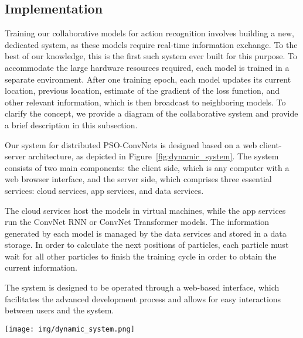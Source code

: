 \documentclass[fleqn,10pt]{wlscirep}
\begin{document}
\subsection{Implementation}
\label{sec:implementation}


Training our collaborative models for action recognition involves building a new, dedicated system, as these models require real-time information exchange. To the best of our knowledge, this is the first such system ever built for this purpose. To accommodate the large hardware resources required, each model is trained in a separate environment. After one training epoch, each model updates its current location, previous location, estimate of the gradient of the loss function, and other relevant information, which is then broadcast to neighboring models. To clarify the concept, we provide a diagram of the collaborative system and provide a brief description in this subsection.





Our system for distributed PSO-ConvNets is designed based on a web client-server architecture, as depicted in Figure~\ref{fig:dynamic_system}. The system consists of two main components: the client side, which is any computer with a web browser interface, and the server side, which comprises three essential services: cloud services, app services, and data services.

The cloud services host the models in virtual machines, while the app services run the ConvNet RNN or ConvNet Transformer models. The information generated by each model is managed by the data services and stored in a data storage. In order to calculate the next positions of particles, each particle must wait for all other particles to finish the training cycle in order to obtain the current information.

The system is designed to be operated through a web-based interface, which facilitates the advanced development process and allows for easy interactions between users and the system.
\begin{figure*}[htb!]
\begin{center}
\texttt{[image: img/dynamic\_system.png]}
\caption{Dynamic PSO-ConvNets System Design. The system is divided into two main components, client and server. The client side is accessed through web browser interface while the server side comprises of cloud, app, and data services. The cloud stores virtual machine environments where the models reside. The app service is where the ConvNet-RNN or ConvNet-Transformer runs, and the information generated by each model is managed and saved by the data service. The particles in the system update their positions based on shared information, including current and previous locations, after completing a training cycle.}
\label{fig:dynamic_system}
\end{center}
\end{figure*}
\end{document}
